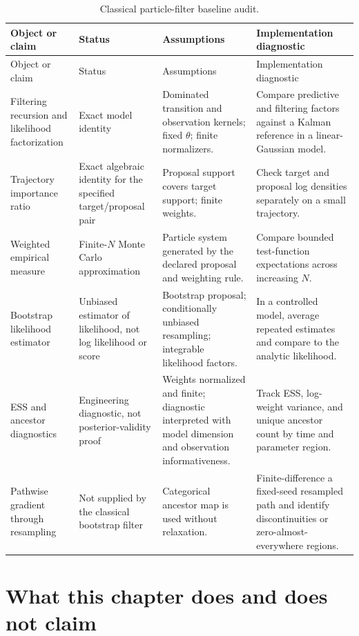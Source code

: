 \begin{center}
\scriptsize
\begin{longtable}{@{}p{} p{} p{} p{}@{}}
\caption{Classical particle-filter baseline audit.}
\label{tab:bf-pf-baseline-audit}\\
\toprule
Object or claim & Status & Assumptions & Implementation diagnostic \\
\midrule
\endfirsthead
\toprule
Object or claim & Status & Assumptions & Implementation diagnostic \\
\midrule
\endhead
Filtering recursion and likelihood factorization &
Exact model identity &
Dominated transition and observation kernels; fixed $\theta$; finite
normalizers. &
Compare predictive and filtering factors against a Kalman reference in a
linear-Gaussian model. \\
Trajectory importance ratio &
Exact algebraic identity for the specified target/proposal pair &
Proposal support covers target support; finite weights. &
Check target and proposal log densities separately on a small trajectory. \\
Weighted empirical measure &
Finite-$N$ Monte Carlo approximation &
Particle system generated by the declared proposal and weighting rule. &
Compare bounded test-function expectations across increasing $N$. \\
Bootstrap likelihood estimator &
Unbiased estimator of likelihood, not log likelihood or score &
Bootstrap proposal; conditionally unbiased resampling; integrable likelihood
factors. &
In a controlled model, average repeated estimates and compare to the analytic
likelihood. \\
ESS and ancestor diagnostics &
Engineering diagnostic, not posterior-validity proof &
Weights normalized and finite; diagnostic interpreted with model dimension and
observation informativeness. &
Track ESS, log-weight variance, and unique ancestor count by time and
parameter region. \\
Pathwise gradient through resampling &
Not supplied by the classical bootstrap filter &
Categorical ancestor map is used without relaxation. &
Finite-difference a fixed-seed resampled path and identify discontinuities or
zero-almost-everywhere regions. \\
\bottomrule
\end{longtable}
\end{center}

\section{What this chapter does and does not claim}
\label{sec:bf-pf-chapter-boundary}

